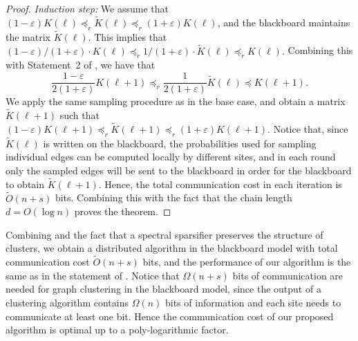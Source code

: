 \begin{proof}
\emph{Induction step:} We assume that 
$
(1-\varepsilon)K(\ell)\preceq_r\tilde{K}(\ell) \preceq_r (1+\varepsilon)K(\ell)$,
and the blackboard maintains the matrix $\tilde{K}(\ell)$. This implies that
$
(1-\varepsilon)/(1+\varepsilon)\cdot K(\ell)\preceq_r 1/(1+\varepsilon)\cdot \tilde{K}(\ell) \preceq_r K(\ell).
$
Combining this with Statement~2 of , we have that 
\[
\frac{1-\varepsilon}{2(1+\varepsilon)}K(\ell+1)\preceq_r \frac{1}{2(1+\varepsilon)}\tilde{K}(\ell) \preceq K(\ell+1).
\]
We apply the same sampling procedure as in the base case, and obtain a matrix $\tilde{K}(\ell+1)$ such that $
(1-\varepsilon) K(\ell+1) \preceq_r\tilde{K}(\ell+1) \preceq_r (1+\varepsilon) K(\ell+1)$.
Notice that, since $\tilde{K}(\ell)$ is written on  the blackboard, the probabilities used for sampling individual edges can be computed locally by different sites, and in each round only the sampled edges will be sent to the blackboard in order for the blackboard to obtain $\tilde{K}(\ell+1)$. Hence, the total communication cost in each iteration is $\tilde{O}(n+s)$ bits. Combining this with the fact that the chain length $d=O(\log n)$ proves the theorem. 
\end{proof}




Combining  and the fact that a spectral sparsifier preserves the structure of clusters, 
we obtain a distributed  algorithm in the blackboard model with total communication cost $\tilde{O}(n+s)$ bits, and the performance of our algorithm is the same as in the statement of . Notice that $\Omega(n+s)$ bits of communication are needed for graph clustering in the blackboard model, since the output of a clustering algorithm contains $\Omega(n)$ bits of information and each site needs to communicate at least one bit. Hence the communication cost of our proposed algorithm is optimal up to a poly-logarithmic factor.

 
